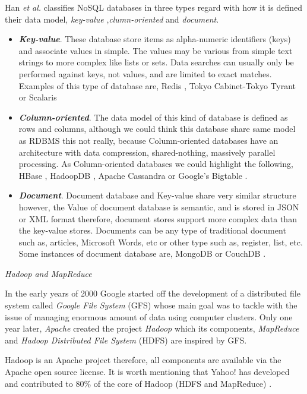 Han \emph{et al.} \cite{han2011survey} classifies NoSQL databases in three types regard with how it is defined their data model, \textit{key-value} ,\textit{clumn-oriented} and \textit{document}.
\begin{itemize}
    \item \textbf{\textit{Key-value}}. These database store items as alpha-numeric identifiers (keys) and associate values in simple. The values may be various from simple text strings to  more complex like lists or sets. Data searches can usually only be performed against keys, not values, and are limited to exact matches. Examples of this type of database are, Redis \cite{carlson2013redis},  Tokyo Cabinet-Tokyo Tyrant \cite{cattell2011scalable} or Scalaris \cite{leavitt2010will}
    \item \textbf{\textit{Column-oriented}}. The data model of this kind of database is defined as rows and columns, although we could think this database share same model as RDBMS this not really, because Column-oriented databases have an architecture with data compression, shared-nothing, massively parallel processing. As Column-oriented databases we could highlight the following, HBase \cite{george2011hbase}, HadoopDB \cite{abouzeid2009hadoopdb}, Apache Cassandra \cite{dede2013evaluation} or Google's Bigtable \cite{chang2008bigtable}.
    \item \textbf{\textit{Document}}. Document database and Key-value share very similar structure however, the Value of document database is semantic, and is stored in JSON or XML format therefore, document stores support more complex data than the key-value stores. Documents can be any type of traditional document such as, articles, Microsoft Words, etc or other type such as, register, list, etc. Some instances of document database are, MongoDB \cite{banker2011mongodb} or CouchDB \cite{provost2013data}.
\end{itemize}

\emph{Hadoop and MapReduce}

In the early years of 2000 Google started off the development of a distributed file system called \textit{Google File System} (GFS) \cite{ghemawat2003google} whose main goal was to tackle with the issue of managing enormous amount of data using computer clusters. Only one year later, \textit{Apache} created the project \textit{Hadoop} which its components, \textit{MapReduce} and \textit{Hadoop Distributed File System} (HDFS) are inspired by GFS.

Hadoop is an Apache project therefore, all components are available via the Apache open source license. It is worth mentioning that Yahoo! has developed and contributed to 80\% of the core of Hadoop (HDFS and MapReduce) \cite{shvachko2010hadoop}.

